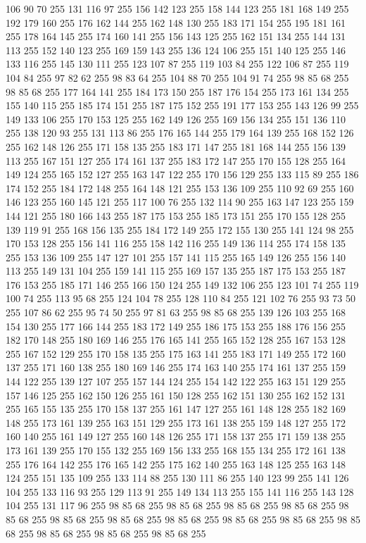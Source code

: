 106 90 70 255 131 116 97 255 156 142 123 255 158 144 123 255 181 168 149 255 192 179 160 255 176 162 144 255 162 148 130 255 183 171 154 255 195 181 161 255 178 164 145 255 174 160 141 255 156 143 125 255 162 151 134 255 144 131 113 255 152 140 123 255 169 159 143 255 136 124 106 255 151 140 125 255 146 133 116 255 145 130 111 255 123 107 87 255 119 103 84 255 122 106 87 255 119 104 84 255 97 82 62 255 98 83 64 255 104 88 70 255 104 91 74 255 98 85 68 255 98 85 68 255 177 164 141 255 184 173 150 255 187 176 154 255 173 161 134 255 155 140 115 255 185 174 151 255 187 175 152 255 191 177 153 255 143 126 99 255 149 133 106 255 170 153 125 255 162 149 126 255 169 156 134 255 151 136 110 255 138 120 93 255 131 113 86 255 176 165 144 255 179 164 139 255 168 152 126 255 162 148 126 255 171 158 135 255 183 171 147 255 181 168 144 255 156 139 113 255 167 151 127 255 174 161 137 255 183 172 147 255 170 155 128 255 164 149 124 255 165 152 127 255 163 147 122 255 170 156 129 255 133 115 89 255
186 174 152 255 184 172 148 255 164 148 121 255 153 136 109 255 110 92 69 255 160 146 123 255 160 145 121 255 117 100 76 255 132 114 90 255 163 147 123 255 159 144 121 255 180 166 143 255 187 175 153 255 185 173 151 255 170 155 128 255 139 119 91 255 168 156 135 255 184 172 149 255 172 155 130 255 141 124 98 255 170 153 128 255 156 141 116 255 158 142 116 255 149 136 114 255 174 158 135 255 153 136 109 255 147 127 101 255 157 141 115 255 165 149 126 255 156 140 113 255 149 131 104 255 159 141 115 255 169 157 135 255 187 175 153 255 187 176 153 255 185 171 146 255 166 150 124 255 149 132 106 255 123 101 74 255 119 100 74 255 113 95 68 255 124 104 78 255 128 110 84 255 121 102 76 255 93 73 50 255 107 86 62 255 95 74 50 255 97 81 63 255 98 85 68 255 139 126 103 255 168 154 130 255 177 166 144 255 183 172 149 255 186 175 153 255 188 176 156 255 182 170 148 255 180 169 146 255 176 165 141 255 165 152 128 255 167 153 128 255 167 152 129 255 170 158 135 255 175 163 141 255 183 171 149 255
172 160 137 255 171 160 138 255 180 169 146 255 174 163 140 255 174 161 137 255 159 144 122 255 139 127 107 255 157 144 124 255 154 142 122 255 163 151 129 255 157 146 125 255 162 150 126 255 161 150 128 255 162 151 130 255 162 152 131 255 165 155 135 255 170 158 137 255 161 147 127 255 161 148 128 255 182 169 148 255 173 161 139 255 163 151 129 255 173 161 138 255 159 148 127 255 172 160 140 255 161 149 127 255 160 148 126 255 171 158 137 255 171 159 138 255 173 161 139 255 170 155 132 255 169 156 133 255 168 155 134 255 172 161 138 255 176 164 142 255 176 165 142 255 175 162 140 255 163 148 125 255 163 148 124 255 151 135 109 255 133 114 88 255 130 111 86 255 140 123 99 255 141 126 104 255 133 116 93 255 129 113 91 255 149 134 113 255 155 141 116 255 143 128 104 255 131 117 96 255 98 85 68 255 98 85 68 255 98 85 68 255 98 85 68 255 98 85 68 255 98 85 68 255 98 85 68 255 98 85 68 255 98 85 68 255 98 85 68 255 98 85 68 255 98 85 68 255 98 85 68 255 98 85 68 255
